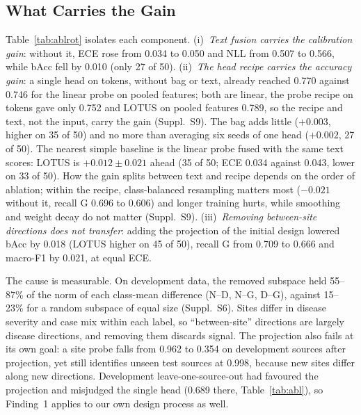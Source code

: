 \documentclass[runningheads]{llncs}
\newcommand{\sups}[1]{Suppl.~S#1}
\begin{document}
\subsection{What Carries the Gain}\label{sec:abl}
\begin{table}[tb]
\caption{Ablation over the 50 rotations, same splits and recipe, TS, means over three seeds. Last two columns: LOTUS minus the row in bAcc, and rotations where LOTUS is higher. The full factorial (nine arms, with AUROC, AURC and risk) is in \sups{6}.}\label{tab:ablrot}
\centering\scriptsize\setlength{\tabcolsep}{2.4pt}
\end{table}

Table~\ref{tab:ablrot} isolates each component. (i)~\emph{Text fusion carries the calibration gain}: without it, ECE rose from 0.034 to 0.050 and NLL from 0.507 to 0.566, while bAcc fell by 0.010 (only 27 of 50). (ii)~\emph{The head recipe carries the accuracy gain}: a single head on tokens, without bag or text, already reached 0.770 against 0.746 for the linear probe on pooled features; both are linear, the probe recipe on tokens gave only 0.752 and LOTUS on pooled features 0.789, so the recipe and text, not the input, carry the gain (\sups{9}). The bag adds little ($+0.003$, higher on 35 of 50) and no more than averaging six seeds of one head ($+0.002$, 27 of 50). The nearest simple baseline is the linear probe fused with the same text scores: LOTUS is $+0.012\pm0.021$ ahead (35 of 50; ECE 0.034 against 0.043, lower on 33 of 50). How the gain splits between text and recipe depends on the order of ablation; within the recipe, class-balanced resampling matters most ($-0.021$ without it, recall G 0.696 to 0.606) and longer training hurts, while smoothing and weight decay do not matter (\sups{9}). (iii)~\emph{Removing between-site directions does not transfer}: adding the projection of the initial design lowered bAcc by 0.018 (LOTUS higher on 45 of 50), recall G from 0.709 to 0.666 and macro-F1 by 0.021, at equal ECE.

The cause is measurable. On development data, the removed subspace held 55--87\% of the norm of each class-mean difference (N--D, N--G, D--G), against 15--23\% for a random subspace of equal size (\sups{6}). Sites differ in disease severity and case mix within each label, so ``between-site'' directions are largely disease directions, and removing them discards signal. The projection also fails at its own goal: a site probe falls from 0.962 to 0.354 on development sources after projection, yet still identifies unseen test sources at 0.998, because new sites differ along new directions. Development leave-one-source-out had favoured the projection and misjudged the single head (0.689 there, Table~\ref{tab:abl}), so Finding~1 applies to our own design process as well.
\end{document}
